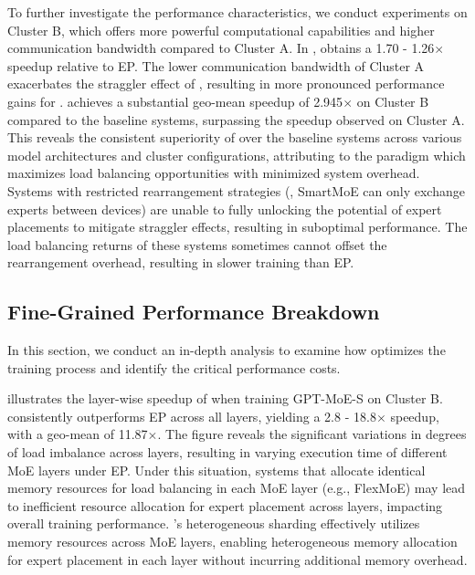 To further investigate the performance characteristics, we conduct experiments on Cluster B, which offers more powerful computational capabilities and higher communication bandwidth compared to Cluster A.
In , \xxx obtains a 1.70 - 1.26$\times$ speedup relative to EP.
The lower communication bandwidth of Cluster A exacerbates the straggler effect of \collatoa, resulting in more pronounced performance gains for \xxx.
\xxx achieves a substantial geo-mean speedup of 2.945$\times$ on Cluster B compared to the baseline systems, surpassing the speedup observed on Cluster A.
This reveals the consistent superiority of \xxx over the baseline systems across various model architectures and cluster configurations, attributing to the \yyy paradigm which maximizes load balancing opportunities with minimized system overhead.
Systems with restricted rearrangement strategies (\eg, SmartMoE can only exchange experts between devices) are unable to fully unlocking the potential of expert placements to mitigate straggler effects, resulting in suboptimal performance.
The load balancing returns of these systems sometimes cannot offset the rearrangement overhead, resulting in slower training than EP.






\subsection{Fine-Grained Performance Breakdown}

In this section, we conduct an in-depth analysis to examine how \xxx optimizes the training process and identify the critical performance costs.



 illustrates the layer-wise speedup of \xxx when training GPT-MoE-S on Cluster B.
\xxx consistently outperforms EP across all layers, yielding a 2.8 - 18.8$\times$ speedup, with a geo-mean of 11.87$\times$.
The figure reveals the significant variations in degrees of load imbalance across layers, resulting in varying execution time of different MoE layers under EP.
Under this situation, systems that allocate identical memory resources for load balancing in each MoE layer (e.g., FlexMoE) may lead to inefficient resource allocation for expert placement across layers, impacting overall training performance.
\xxx's heterogeneous sharding effectively utilizes memory resources across MoE layers, enabling heterogeneous memory allocation for expert placement in each layer without incurring additional memory overhead.

